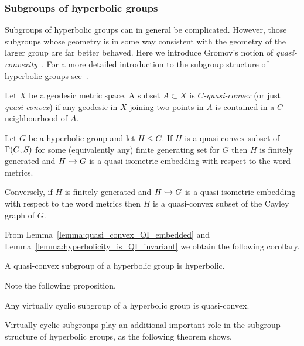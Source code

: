 \subsubsection{Subgroups of hyperbolic groups} 

Subgroups of hyperbolic groups can in general be complicated.
However, those subgroups whose geometry is in some way consistent with the geometry of the larger group are far better behaved.
Here we introduce Gromov's notion of \emph{quasi-convexity}~\cite{gromov87}.
For a more detailed introduction to the subgroup structure of hyperbolic groups see~\cite{bridsonhaefliger99}.

\begin{definition}
  Let $X$ be a geodesic metric space.
  A subset $A \subset X$ is \emph{$C$-quasi-convex} (or just \emph{quasi-convex}) if any geodesic in $X$ joining two points in $A$ is contained in a $C$-neighbourhood of $A$.
\end{definition}

\begin{lemma}\cite[III.H.3.5--III.H.3.6]{bridsonhaefliger99}\label{lemma:quasi_convex_QI_embedded}
  Let $G$ be a hyperbolic group and let $H \leq G$.
  If $H$ is a quasi-convex subset of\/ $\operatorname{\Gamma}(G,S)$ for some (equivalently any) finite generating set for $G$ then $H$ is finitely generated and $H \hookrightarrow G$ is a quasi-isometric embedding with respect to the word metrics.

  Conversely, if $H$ is finitely generated and $H \hookrightarrow G$ is a quasi-isometric embedding with respect to the word metrics then $H$ is a quasi-convex subset of the Cayley graph of $G$.
\end{lemma}

From Lemma~\ref{lemma:quasi_convex_QI_embedded} and Lemma~\ref{lemma:hyperbolicity_is_QI_invariant} we obtain the following corollary.

\begin{corollary}
  A quasi-convex subgroup of a hyperbolic group is hyperbolic.
\end{corollary}

Note the following proposition.

\begin{proposition}\cite{gromov87}
  Any virtually cyclic subgroup of a hyperbolic group is quasi-convex.
\end{proposition}

Virtually cyclic subgroups play an additional important role in the subgroup structure of hyperbolic groups, as the following theorem shows.

